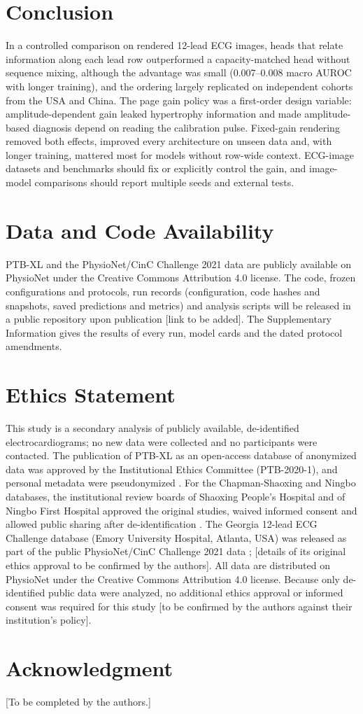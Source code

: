 \documentclass[journal]{IEEEtran}
\begin{document}
\section{Conclusion}
In a controlled comparison on rendered 12-lead ECG images, heads that relate information along each lead row outperformed a capacity-matched head without sequence mixing, although the advantage was small (0.007--0.008 macro AUROC with longer training), and the ordering largely replicated on independent cohorts from the USA and China. The page gain policy was a first-order design variable: amplitude-dependent gain leaked hypertrophy information and made amplitude-based diagnosis depend on reading the calibration pulse. Fixed-gain rendering removed both effects, improved every architecture on unseen data and, with longer training, mattered most for models without row-wide context. ECG-image datasets and benchmarks should fix or explicitly control the gain, and image-model comparisons should report multiple seeds and external tests.

\section*{Data and Code Availability}
PTB-XL and the PhysioNet/CinC Challenge 2021 data are publicly available on PhysioNet under the Creative Commons Attribution 4.0 license. The code, frozen configurations and protocols, run records (configuration, code hashes and snapshots, saved predictions and metrics) and analysis scripts will be released in a public repository upon publication [link to be added]. The Supplementary Information gives the results of every run, model cards and the dated protocol amendments.

\section*{Ethics Statement}
This study is a secondary analysis of publicly available, de-identified electrocardiograms; no new data were collected and no participants were contacted. The publication of PTB-XL as an open-access database of anonymized data was approved by the Institutional Ethics Committee (PTB-2020-1), and personal metadata were pseudonymized \cite{wagner2020ptbxl}. For the Chapman-Shaoxing and Ningbo databases, the institutional review boards of Shaoxing People's Hospital and of Ningbo First Hospital approved the original studies, waived informed consent and allowed public sharing after de-identification \cite{zheng2020chapman,zheng2022ningbo}. The Georgia 12-lead ECG Challenge database (Emory University Hospital, Atlanta, USA) was released as part of the public PhysioNet/CinC Challenge 2021 data \cite{reyna2021challenge,reyna2022challengedata}; [details of its original ethics approval to be confirmed by the authors]. All data are distributed on PhysioNet under the Creative Commons Attribution 4.0 license. Because only de-identified public data were analyzed, no additional ethics approval or informed consent was required for this study [to be confirmed by the authors against their institution's policy].

\section*{Acknowledgment}
[To be completed by the authors.]



\end{document}
